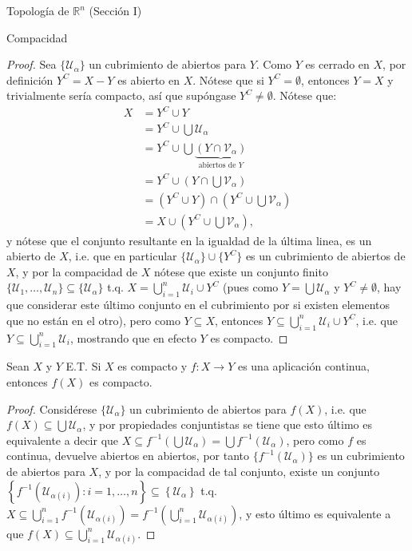\begin{chapter}{Topología de $\mathbb{R}^n$ (Sección I)}
\begin{section}{Compacidad}
\begin{proof}
Sea $\{\mathcal{U}_\alpha\}$ un cubrimiento de abiertos para $Y$. Como $Y$ es cerrado en $X$, por definición $Y^C=X-Y$ es abierto en $X$. Nótese que si $Y^C=\emptyset$, entonces $Y=X$ y trivialmente sería compacto, así que supóngase $Y^C\neq\emptyset$. Nótese que:
\begin{equation*} \label{eq1}
\begin{split}
X & = Y^C\cup Y \\
 & = Y^C\cup\bigcup\mathcal{U}_\alpha \\
 & = Y^C\cup\bigcup\underbrace{(Y\cap\mathcal{V}_\alpha)}_{\text{abiertos de $Y$}} \\
 & = Y^C\cup \left(Y\cap\bigcup\mathcal{V}_\alpha\right) \\
 & = (Y^C\cup Y)\cap \left(Y^C\cup\bigcup\mathcal{V}_\alpha\right) \\
 & = X\cup\left(Y^C\cup\bigcup\mathcal{V}_\alpha\right),
\end{split}
\end{equation*}
y nótese que el conjunto resultante en la igualdad de la última linea, es un abierto de $X$, i.e. que en particular $\{\mathcal{U}_\alpha\}\cup\{Y^C\}$ es un cubrimiento de abiertos de $X$, y por la compacidad de $X$ nótese que existe un conjunto finito $\{\mathcal{U}_1,\ldots,\mathcal{U}_n\}\subseteq\{\mathcal{U}_\alpha\}$ t.q. $X=\bigcup_{i=1}^n\mathcal{U}_i\cup Y^C$ (pues como $Y=\bigcup\mathcal{U}_\alpha$ y $Y^C\neq\emptyset$, hay que considerar este último conjunto en el cubrimiento por si existen elementos que no están en el otro), pero como $Y\subseteq X$, entonces $Y\subseteq\bigcup_{i=1}^n\mathcal{U}_i\cup Y^C$, i.e. que $Y\subseteq\bigcup_{i=1}^n\mathcal{U}_i$, mostrando que en efecto $Y$ es compacto.
\end{proof}

\begin{them}
Sean $X$ y $Y$ E.T. Si $X$ es compacto y $f:X\to Y$ es una aplicación continua, entonces $f(X)$ es compacto.
\end{them}

\begin{proof}
Considérese $\{\mathcal{U}_\alpha\}$ un cubrimiento de abiertos para $f(X)$, i.e. que $f(X)\subseteq\bigcup\mathcal{U}_\alpha$, y por propiedades conjuntistas se tiene que esto último es equivalente a decir que $X\subseteq f^{-1}\left(\bigcup\mathcal{U}_\alpha\right)=\bigcup f^{-1}(\mathcal{U}_\alpha)$, pero como $f$ es continua, devuelve abiertos en abiertos, por tanto $\{f^{-1}(\mathcal{U}_\alpha)\}$ es un cubrimiento de abiertos para $X$, y por la compacidad de tal conjunto, existe un conjunto $\left\lbrace f^{-1}(\mathcal{U}_{\alpha(i)}):i=1,\ldots,n\right\rbrace\subseteq\left\lbrace\mathcal{U}_\alpha\right\rbrace$ t.q. $X\subseteq\bigcup_{i=1}^nf^{-1}\left(\mathcal{U}_{\alpha(i)}\right)=f^{-1}\left(\bigcup_{i=1}^n\mathcal{U}_{\alpha(i)}\right)$, y esto último es equivalente a que $f(X)\subseteq\bigcup_{i=1}^n\mathcal{U}_{\alpha(i)}$.
\end{proof}

\end{section}
\end{chapter}
